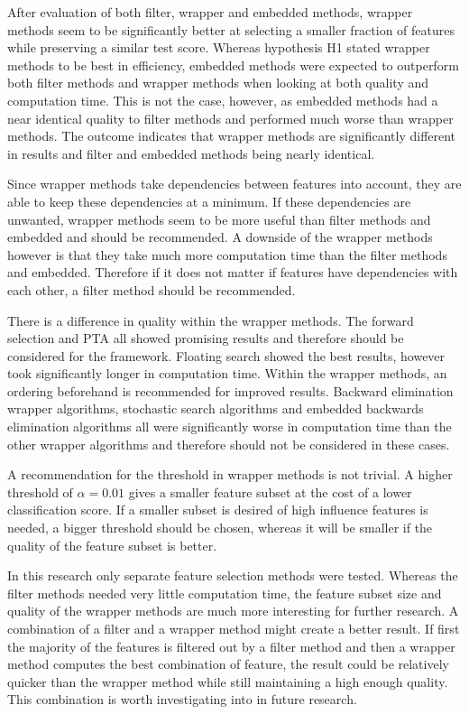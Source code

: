 \documentclass[10pt,a4paper]{report}
\begin{document}
	After evaluation of both filter, wrapper and embedded methods, wrapper methods seem to be significantly better at selecting a smaller fraction of features while preserving a similar test score.  Whereas hypothesis H1 stated wrapper methods to be best in efficiency, embedded methods were expected to outperform both filter methods and wrapper methods when looking at both quality and computation time. This is not the case, however, as embedded methods had a near identical quality to filter methods and performed much worse than wrapper methods. The outcome indicates that wrapper methods are significantly different in results and filter and embedded methods being nearly identical.
	
	Since wrapper methods take dependencies between features into account, they are able to keep these dependencies at a minimum. If these dependencies are unwanted, wrapper methods seem to be more useful than filter methods and embedded and should be recommended. A downside of the wrapper methods however is that they take much more computation time than the filter methods and embedded. Therefore if it does not matter if features have dependencies with each other, a filter method should be recommended.
	
	There is a difference in quality within the wrapper methods. The forward selection and PTA all showed promising results and therefore should be considered for the framework. Floating search showed the best results, however took significantly longer in computation time. Within the wrapper methods, an ordering beforehand is recommended for improved results. Backward elimination wrapper algorithms, stochastic search algorithms and embedded backwards elimination algorithms all were significantly worse in computation time than the other wrapper algorithms and therefore should not be considered in these cases.
	
	A recommendation for the threshold in wrapper methods is not trivial. A higher threshold of $\alpha = 0.01$ gives a smaller feature subset at the cost of a lower classification score. If a smaller subset is desired of high influence features is needed, a bigger threshold should be chosen, whereas it will be smaller if the quality of the feature subset is better.
	
	In this research only separate feature selection methods were tested. Whereas the filter methods needed very little computation time, the feature subset size and quality of the wrapper methods are much more interesting for further research. A combination of a filter and a wrapper method might create a better result. If first the majority of the features is filtered out by a filter method and then a wrapper method computes the best combination of feature, the result could be relatively quicker than the wrapper method while still maintaining a high enough quality. This combination is worth investigating into in future research.
	
\end{document}
